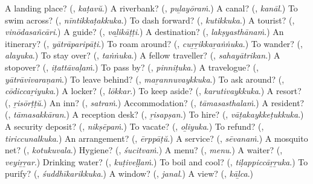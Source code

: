 \begin{tcolorbox}[breakable,colback=teal!4,colframe=teal!35!black,title={Before you move on}]
A landing place? (\textbf{}, \emph{kaṭavŭ}.) A riverbank? (\textbf{}, \emph{puḻayōraṁ}.) A canal? (\textbf{}, \emph{kanāl}.) To swim across? (\textbf{}, \emph{nīntikkaṭakkuka}.) To dash forward? (\textbf{}, \emph{kutikkuka}.) A tourist? (\textbf{}, \emph{vinōdasañcāri}.) A guide? (\textbf{}, \emph{vaḻikāṭṭi}.) A destination? (\textbf{}, \emph{lakṣyasthānaṁ}.) An itinerary? (\textbf{}, \emph{yātrāparipāṭi}.) To roam around? (\textbf{}, \emph{cuṟṟikkaṟaṅṅuka}.) To wander? (\textbf{}, \emph{alayuka}.) To stay over? (\textbf{}, \emph{taṅṅuka}.) A fellow traveller? (\textbf{}, \emph{sahayātrikan}.) A stopover? (\textbf{}, \emph{iṭattāvaḷaṁ}.) To pass by? (\textbf{}, \emph{pinniṭuka}.) A travelogue? (\textbf{}, \emph{yātrāvivaraṇaṁ}.) To leave behind? (\textbf{}, \emph{maṟannuvaykkuka}.) To ask around? (\textbf{}, \emph{cōdiccaṟiyuka}.) A locker? (\textbf{}, \emph{lōkkar}.) To keep aside? (\textbf{}, \emph{karutivaykkuka}.) A resort? (\textbf{}, \emph{ṟisōrṭṭŭ}.) An inn? (\textbf{}, \emph{satraṁ}.) Accommodation? (\textbf{}, \emph{tāmasasthalaṁ}.) A resident? (\textbf{}, \emph{tāmasakkāran}.) A reception desk? (\textbf{}, \emph{ṟisapṣan}.) To hire? (\textbf{}, \emph{vāṭakaykkeṭukkuka}.) A security deposit? (\textbf{}, \emph{nikṣēpaṁ}.) To vacate? (\textbf{}, \emph{oḻiyuka}.) To refund? (\textbf{}, \emph{tiriccunalkuka}.) An arrangement? (\textbf{}, \emph{ērppāṭŭ}.) A service? (\textbf{}, \emph{sēvanaṁ}.) A mosquito net? (\textbf{}, \emph{kotukuvala}.) Hygiene? (\textbf{}, \emph{śucitvaṁ}.) A menu? (\textbf{}, \emph{menu}.) A waiter? (\textbf{}, \emph{veyiṟṟar}.) Drinking water? (\textbf{}, \emph{kuṭiveḷḷaṁ}.) To boil and cool? (\textbf{}, \emph{tiḷappiccāṟṟuka}.) To purify? (\textbf{}, \emph{śuddhīkarikkuka}.) A window? (\textbf{}, \emph{janal}.) A view? (\textbf{}, \emph{kāḻca}.)
\end{tcolorbox}
